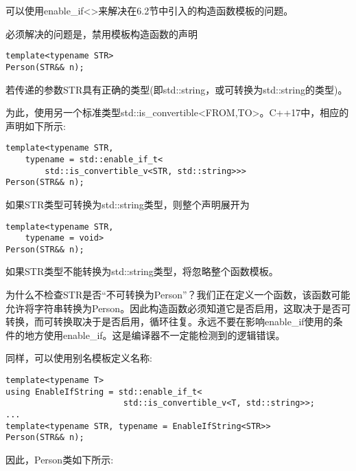 可以使用enable\_if<>来解决在6.2节中引入的构造函数模板的问题。

必须解决的问题是，禁用模板构造函数的声明

\begin{lstlisting}[style=styleCXX]
template<typename STR>
Person(STR&& n);
\end{lstlisting}

若传递的参数STR具有正确的类型(即std::string，或可转换为std::string的类型)。

为此，使用另一个标准类型std::is\_convertible<FROM,TO>。C++17中，相应的声明如下所示:

\begin{lstlisting}[style=styleCXX]
template<typename STR,
	typename = std::enable_if_t<
		std::is_convertible_v<STR, std::string>>>
Person(STR&& n);
\end{lstlisting}

如果STR类型可转换为std::string类型，则整个声明展开为

\begin{lstlisting}[style=styleCXX]
template<typename STR,
	typename = void>
Person(STR&& n);
\end{lstlisting}

如果STR类型不能转换为std::string类型，将忽略整个函数模板。

\begin{tcolorbox}[colback=webgreen!5!white,colframe=webgreen!75!black]
\hspace*{0.75cm}为什么不检查STR是否“不可转换为Person”？我们正在定义一个函数，该函数可能允许将字符串转换为Person。因此构造函数必须知道它是否启用，这取决于是否可转换，而可转换取决于是否启用，循环往复。永远不要在影响enable\_if使用的条件的地方使用enable\_if。这是编译器不一定能检测到的逻辑错误。
\end{tcolorbox}

同样，可以使用别名模板定义名称:

\begin{lstlisting}[style=styleCXX]
template<typename T>
using EnableIfString = std::enable_if_t<
						std::is_convertible_v<T, std::string>>;
...
template<typename STR, typename = EnableIfString<STR>>
Person(STR&& n);
\end{lstlisting}

因此，Person类如下所示:

